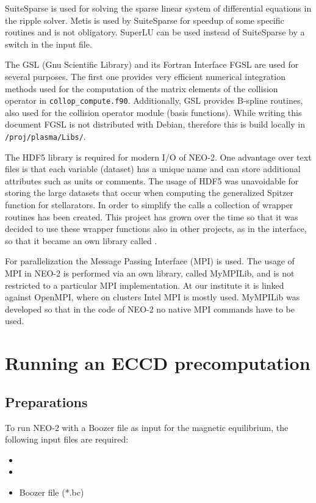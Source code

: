 \documentclass{article}
\newcommand{\vv}[1]{\texttt{\detokenize{#1}}}
\begin{document}
SuiteSparse is used for solving the sparse linear system of differential equations in the ripple solver. Metis is used by SuiteSparse for speedup of some specific routines and is not obligatory. SuperLU can be used instead of SuiteSparse by a switch in the input file. 

The GSL (Gnu Scientific Library) and its Fortran Interface FGSL are used for several purposes. The first one provides very efficient numerical integration methods used for the computation of the matrix elements of the collision operator in \verb|collop_compute.f90|. Additionally, GSL provides B-spline routines, also used for the collision operator module (basis functions). While writing this document FGSL is not distributed with Debian, therefore this is build locally in \verb|/proj/plasma/Libs/|. 

The HDF5 library is required for modern I/O of NEO-2. One advantage over text files is that each variable (dataset) has a unique name and can store additional attributes such as units or comments. The usage of HDF5 was unavoidable for storing the large datasets that occur when computing the generalized Spitzer function for stellarators. In order to simplify the calls a collection of wrapper routines has been created. This project has grown over the time so that it was decided to use these wrapper functions also in other projects, as in the interface, so that it became an own library called \vv{hdf5tools}.

For parallelization the Message Passing Interface (MPI) is used. The usage of MPI in NEO-2 is performed via an own library, called MyMPILib, and is not restricted to a particular MPI implementation. At our institute it is linked against OpenMPI, where on clusters Intel MPI is mostly used. MyMPILib was developed so that in the code of NEO-2 no native MPI commands have to be used. 

\section{Running an ECCD precomputation}
\subsection{Preparations}
To run NEO-2 with a Boozer file as input for the magnetic equilibrium, the following input files are required:
\begin{itemize}
 \item \vv{neo.in}
 \item \vv{neo2.in}
 \item Boozer file (*.bc)
\end{itemize}
\end{document}
